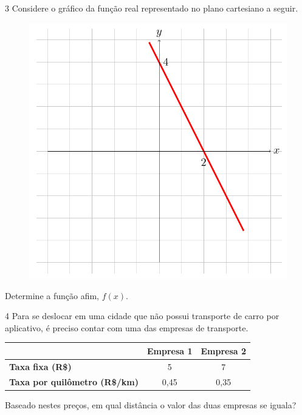 \pagebreak
\num{3} Considere o gráfico da função real representado no plano cartesiano a seguir.

\begin{figure}[htpb!]
\centering
\includegraphics[width=.4\textwidth]{./tikz/007.pdf}
\end{figure}

Determine a função afim, $f(x)$.

\begin{emptybox}
\vspace{2cm}
\end{emptybox}

\num{4} Para se deslocar em uma cidade que não possui transporte
de carro por aplicativo, é preciso contar com uma das empresas de transporte.

\begin{center}
\begin{tabular}{|l |c|c|}
\hline
 & \textbf{Empresa 1} & \textbf{Empresa 2} \\ \hline
\textbf{Taxa fixa (R\$)} & 5 & 7 \\ \hline
\textbf{Taxa por quilômetro (R\$/km)} & 0,45 & 0,35 \\ \hline
\end{tabular}
\end{center}

Baseado nestes preços, em qual distância o valor das duas 
empresas se iguala?

\begin{emptybox}
\end{emptybox}


